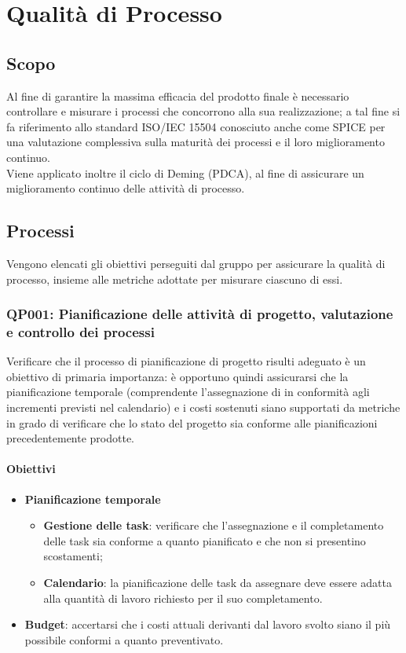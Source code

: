 \chapter{Qualità di Processo}
\label{processo} 
\section{Scopo}
Al fine di garantire la massima efficacia del prodotto finale è necessario controllare e misurare i processi che concorrono alla sua realizzazione; a tal fine si fa riferimento allo standard ISO/IEC 15504 conosciuto anche come SPICE per una valutazione complessiva sulla maturità dei processi e il loro miglioramento continuo.\\
Viene applicato inoltre il ciclo di Deming (PDCA), al fine di assicurare un miglioramento continuo delle attività di processo. 

\section{Processi}
Vengono elencati gli obiettivi perseguiti dal gruppo per assicurare la qualità di processo, insieme alle metriche adottate per misurare ciascuno di essi.
\subsection{QP001: Pianificazione delle attività di progetto, valutazione e controllo dei processi}
Verificare che il processo di pianificazione di progetto risulti adeguato è un obiettivo di primaria importanza: è opportuno quindi assicurarsi che la pianificazione temporale (comprendente l'assegnazione di  in conformità agli incrementi previsti nel calendario) e i costi sostenuti siano supportati da metriche in grado di verificare che lo stato del progetto sia conforme alle pianificazioni precedentemente prodotte.


\subsubsection{Obiettivi}
\begin{itemize}
	\item \textbf{Pianificazione temporale}
	\begin{itemize}
		\item \textbf{Gestione delle task}: verificare che l'assegnazione e il completamento delle task sia conforme a quanto pianificato e che non si presentino scostamenti;
		\item \textbf{Calendario}: la pianificazione delle task da assegnare deve essere adatta alla quantità di lavoro richiesto per il suo completamento.
	\end{itemize}
	\item \textbf{Budget}: accertarsi che i costi attuali derivanti dal lavoro svolto siano il più possibile conformi a quanto preventivato.
\end{itemize}

